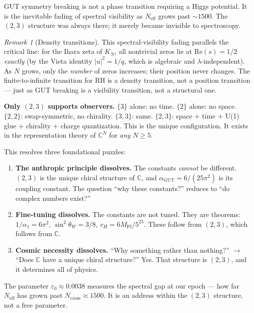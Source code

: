 \documentclass[12pt]{article}
\theoremstyle{remark}
\newtheorem{remark}[theorem]{Remark}
\theoremstyle{definition}
\newcommand{\CC}{\mathbb{C}}
\begin{document}
GUT symmetry breaking is not a phase transition requiring a Higgs potential. It is the inevitable fading of spectral visibility as $N_\text{eff}$ grows past $\sim 1500$. The $(2,3)$ structure was always there; it merely became invisible to spectroscopy.

\begin{remark}[Density transitions]
This spectral-visibility fading parallels the critical line:
for the Ihara zeta of $K_N$, all nontrivial zeros lie at
$\mathrm{Re}(s) = 1/2$ \emph{exactly} (by the Vieta identity
$|u|^2 = 1/q$, which is algebraic and $\lambda$-independent).
As $N$ grows, only the \emph{number} of zeros increases;
their position never changes.  The finite-to-infinite
transition for RH is a density transition, not a position
transition --- just as GUT breaking is a visibility transition,
not a structural one.
\end{remark}

\textbf{Only $(2,3)$ supports observers.} $\{3\}$ alone: no time. $\{2\}$ alone: no space. $\{2,2\}$: swap-symmetric, no chirality. $\{3,3\}$: same. $\{2,3\}$: space $+$ time $+$ U(1) glue $+$ chirality $+$ charge quantization. This is the unique configuration. It exists in the representation theory of $\CC^N$ for \emph{any} $N \geq 5$.

This resolves three foundational puzzles:

\begin{enumerate}
\item \textbf{The anthropic principle dissolves.} The constants \emph{cannot} be different. $(2,3)$ is the unique chiral structure of $\CC$, and $\alpha_\text{GUT} = 6/(25\pi^2)$ is its coupling constant. The question ``why these constants?'' reduces to ``do complex numbers exist?''

\item \textbf{Fine-tuning dissolves.} The constants are not tuned. They are theorems: $1/\alpha_1 = 6\pi^2$, $\sin^2\theta_W = 3/8$, $v_H = 6M_\text{Pl}/5^{25}$. These follow from $(2,3)$, which follows from $\CC$.

\item \textbf{Cosmic necessity dissolves.} ``Why something rather than nothing?'' $\to$ ``Does $\CC$ have a unique chiral structure?'' Yes. That structure is $(2,3)$, and it determines all of physics.
\end{enumerate}

The parameter $\varepsilon_0 \approx 0.0038$ measures the spectral gap at our epoch --- how far $N_\text{eff}$ has grown past $N_\text{cross} \approx 1500$. It is an address within the $(2,3)$ structure, not a free parameter.
\end{document}
